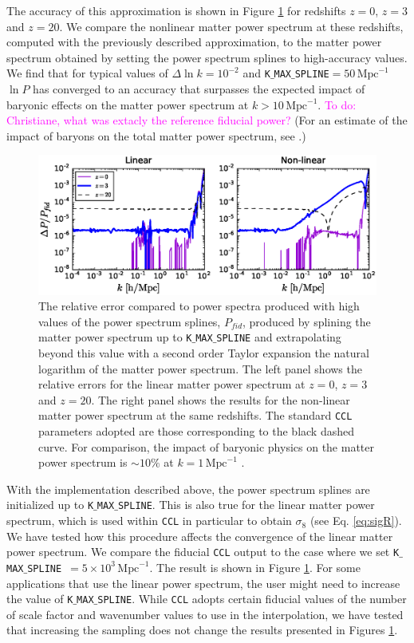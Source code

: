 \documentclass[\docopts]{\docclass}
\newcommand{\todo}[1]{\textcolor{magenta}{To do: #1}}
\newcommand{\ccl}{{\tt CCL}\xspace}
\begin{document}
The accuracy of this approximation is shown in Figure \ref{fig:NLextrapol} for redshifts $z=0$, $z=3$ and $z=20$. We compare the nonlinear matter power spectrum at these redshifts, computed with the previously described approximation, to the matter power spectrum obtained by setting the power spectrum splines to high-accuracy values. We find that for typical values of $\Delta \ln k=10^{-2}$ and {\tt K$\_$MAX$\_$SPLINE}$=50\,\text{Mpc}^{-1}$ $\ln P$ has converged to an accuracy that surpasses the expected impact of baryonic effects on the matter power spectrum at $k>10\,\text{Mpc}^{-1}$. \todo{Christiane, what was extacly the reference fiducial power?} (For an estimate of the impact of baryons on the total matter power spectrum, see \citealt{Schneider15}.) 

\begin{figure}
\centering
\includegraphics[width=1.0\textwidth]{plot_power.eps}
\caption{The relative error compared to power spectra produced with high values of the power spectrum splines, $P_{fid}$, produced by splining the matter power spectrum up to {\tt K$\_$MAX$\_$SPLINE} and extrapolating beyond this value with a second order Taylor expansion the natural logarithm of the matter power spectrum. The left panel shows the relative errors for the linear matter power spectrum at $z=0$, $z=3$ and $z=20$. The right panel shows the results for the non-linear matter power spectrum at the same redshifts. The standard \ccl parameters adopted are those corresponding to the black dashed curve. For comparison, the impact of baryonic physics on the matter power spectrum is $\sim 10\%$ at $k=1\,\text{Mpc}^{-1}$ \citep{Schneider15}.}
\label{fig:NLextrapol}
\end{figure}

With the implementation described above, the power spectrum splines are initialized up to {\tt K$\_$MAX$\_$SPLINE}. This is also true for the linear matter power spectrum, which is used within \ccl in particular to obtain $\sigma_8$ (see Eq. \ref{eq:sigR}). We have tested how this procedure affects the convergence of the linear matter power spectrum. We compare the fiducial \ccl output to the case where we set {\tt K$\_$MAX$\_$SPLINE}~$=5\times 10^3\,\text{Mpc}^{-1}$. The result is shown in Figure \ref{fig:NLextrapol}. For some applications that use the linear power spectrum, the user might need to increase the value of {\tt K$\_$MAX$\_$SPLINE}. While \ccl adopts certain fiducial values of the number of scale factor and wavenumber values to use in the interpolation, we have tested that increasing the sampling does not change the results presented in Figures \ref{fig:NLextrapol}.
\end{document}

